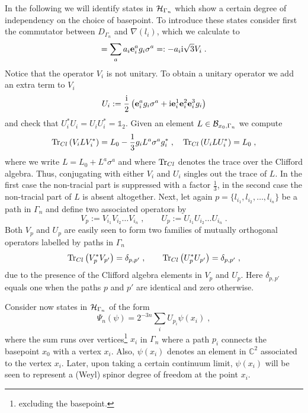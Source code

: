 \documentclass[12pt]{article}
\def\d{\delta}
\def\G{\Gamma}
\def\cb{{\cal B}}
\def\ch{{\cal H}}
\begin{document}
In the following we will identify states in $\ch_{\G_n}$ which show a certain degree of independency on the choice of basepoint. 
To introduce these states consider first
the commutator between $D_{\G_n}$ and $\nabla(l_i)$, which we calculate to 
\begin{equation}
[D_{\G_n},\nabla(l_i)] =\sum_a   a_i  {\bf e}_i^a g_i \sigma^a =:-  a_i \mathrm{i} \sqrt{3} V_i\;.
\label{commu}
\end{equation}
Notice that the operator $V_i$ is not unitary. To obtain a unitary operator we add an extra term to $V_i$
$$
U_i:=  \frac{\mathrm{i} }{2}\left(   {\bf e}_i^a g_i \sigma^a + \mathrm{i} {\bf e}_i^1{\bf e}_i^2{\bf e}_i^3 g_i\right) 
$$
and check that $U_i^*U_i=U_i U_i^*=\mathds{1}_2$.
Given an element $L\in\cb_{x_0,\G_n}$ we compute
$$
\mbox{Tr}_{\tiny Cl}\left( V_i L V_i^*\right)  =  L_0  -\frac{1}{3} g_i L^a\sigma^a g_i^* \;,\quad  \mbox{Tr}_{\tiny Cl}\left(  U_i L U_i^* \right) =  L_0 \;,
$$
where we write $L= L_0 + L^a \sigma^a$ and where $\mbox{Tr}_{\tiny Cl}$ denotes the trace over the Clifford algebra. Thus, conjugating with either $V_i$ and $U_i$ singles out the trace of $L$. In the first case the non-tracial part is suppressed with a factor $\frac{1}{3}$, in the second case the non-tracial part of $L$ is absent altogether.
Next, let again $p=\{ l_{i_1}, l_{i_2},\ldots , l_{i_n}  \}$ be a path in $\G_n$ and define two associated operators by
$$
V_p := V_{i_1} V_{i_2} \ldots V_{i_n}   \;,\qquad U_p := U_{i_1}U_{i_2} \ldots U_{i_n}\;.
$$
Both $V_p$ and $U_p$ are easily seen to form two families of mutually orthogonal operators labelled by paths in $\G_n$
$$
\mbox{Tr}_{\tiny Cl}\left(  V_p^* V_{p'}\right) = \d_{p,p'}\;,\qquad \mbox{Tr}_{\tiny Cl}\left(  U_p^* U_{p'}\right) = \d_{p,p'}\;,
$$
due to the presence of the Clifford algebra elements in $V_p$ and $U_p$. Here $\d_{p,p'}$ equals one when the paths $p$ and $p'$ are identical and zero otherwise. 


Consider now states in $\ch_{\G_n}$ of the form
\begin{equation}
\Psi_{n}(\psi) = 2^{-3n}\sum_i U_{p_i}\psi(x_i)\;,
\label{sss}
\end{equation}
where the sum runs over vertices\footnote{excluding the basepoint.} $x_i$ in $\G_{n}$ where a path $p_i$ connects the basepoint $x_0$ with a vertex $x_i$. Also, $\psi(x_i)$ denotes an element in $\mathbb{C}^2$ associated to the vertex $x_i$. Later, upon taking a certain continuum limit, $\psi(x_i)$ will be seen to represent a (Weyl) spinor degree of freedom at the point $x_i$.
\end{document}
